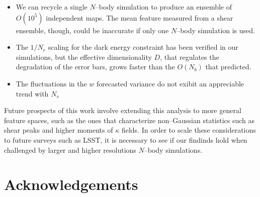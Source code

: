 \documentclass[reprint,aps,prd,superscriptaddress,showkeys,showpacs]{revtex4-1}
\begin{document}
\begin{itemize}
\item We can recycle a single $N$--body simulation to produce an ensemble of $O(10^5)$ independent maps. The mean feature measured from a shear ensemble, though, could be inaccurate if only one $N$--body simulation is used.  
\item The $1/N_r$ scaling for the dark energy constraint has been verified in our simulations, but the effective dimensionality $D$, that regulates the degradation of the error bars, grows faster than the $O(N_b)$ that \citep{DodelsonSchneider13} predicted. 
\item The fluctuations in the $w$ forecasted variance do not exibit an appreciable trend with $N_s$ 
\end{itemize}
%
Future prospects of this work involve extending this analysis to more general feature spaces, such as the ones that characterize non--Gaussian statistics such as shear peaks and higher moments of $\kappa$ fields. In order to scale these considerations to future surveys such as LSST, it is necessary to see if our findinds hold when challenged by larger and higher resolutions $N$--body simulations.  

 

\section*{Acknowledgements}



\label{lastpage}
\end{document}
